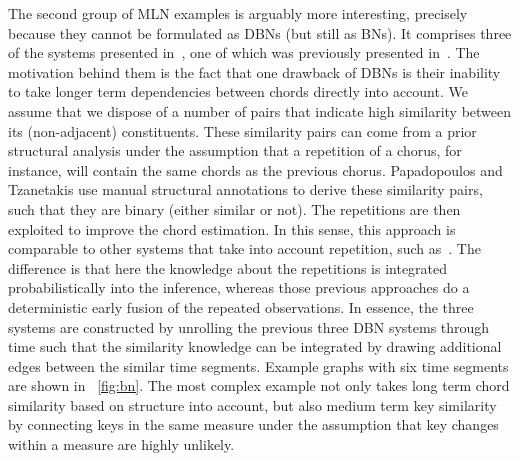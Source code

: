 \documentclass[letterpaper]{article} %
\newcommand{\figref}[1]{\figurename~\ref{fig:#1}} %
\begin{document}
The second group of MLN examples is arguably more interesting, precisely because they cannot be formulated as DBNs (but still as BNs). It comprises three of the systems presented in~\cite{papadopoulos2017taslp}, one of which was previously presented in~\cite{papadopoulos2013icassp}. The motivation behind them is the fact that one drawback of DBNs is their inability to take longer term dependencies between chords directly into account. We assume that we dispose of a number of pairs that indicate high similarity between its (non-adjacent) constituents. These similarity pairs can come from a prior structural analysis under the assumption that a repetition of a chorus, for instance, will contain the same chords as the previous chorus. Papadopoulos and Tzanetakis use manual structural annotations to derive these similarity pairs, such that they are binary (either similar or not). The repetitions are then exploited to improve the chord estimation. In this sense, this approach is comparable to other systems that take into account repetition, such as~\cite{mauch2009ismir,cho2011ismir}. The difference is that here the knowledge about the repetitions is integrated probabilistically into the inference, whereas those previous approaches do a deterministic early fusion of the repeated observations. In essence, the three systems are constructed by unrolling the previous three DBN systems through time such that the similarity knowledge can be integrated by drawing additional edges between the similar time segments. Example graphs with six time segments are shown in \figref{bn}. The most complex example not only takes long term chord similarity based on structure into account, but also medium term key similarity by connecting keys in the same measure under the assumption that key changes within a measure are highly unlikely.
\end{document}
